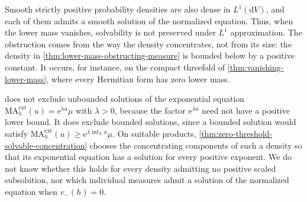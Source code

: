 Smooth strictly positive probability densities are also dense in $L^1(\mathrm{d}V)$, and each of them admits a smooth solution of the normalized equation. Thus, when the lower mass vanishes, solvability is not preserved under $L^1$ approximation. The obstruction comes from the way the density concentrates, not from its size: the density in \cref{thm:lower-mass-obstructing-measure} is bounded below by a positive constant. It occurs, for instance, on the compact threefold of \cref{thm:vanishing-lower-mass}, where every Hermitian form has zero lower mass.

 does not exclude unbounded solutions of the exponential equation $\mathrm{MA}^{\mathrm{ext}}_h(u)=\mathrm{e}^{\lambda u}\mu$ with $\lambda>0$, because the factor $\mathrm{e}^{\lambda u}$ need not have a positive lower bound. It does exclude bounded solutions, since a bounded solution would satisfy $\mathrm{MA}^{\mathrm{ext}}_h(u)\geq\mathrm{e}^{\lambda\inf_Xu}\mu$. On suitable products, \cref{thm:zero-threshold-solvable-concentration} chooses the concentrating components of such a density so that its exponential equation has a solution for every positive exponent. We do not know whether this holds for every density admitting no positive scaled subsolution, nor which individual measures admit a solution of the normalized equation when $v_-(h)=0$.
